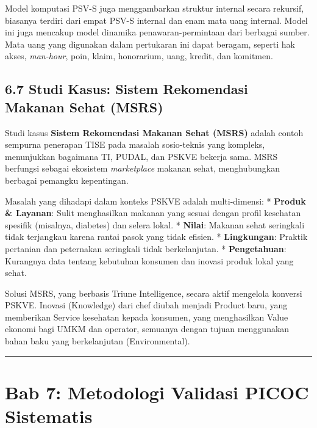 \documentclass[
  letterpaper,
  DIV=11,
  numbers=noendperiod]{scrreprt}
\begin{document}
Model komputasi PSV-S juga menggambarkan struktur internal secara
rekursif, biasanya terdiri dari empat PSV-S internal dan enam mata uang
internal. Model ini juga mencakup model dinamika penawaran-permintaan
dari berbagai sumber. Mata uang yang digunakan dalam pertukaran ini
dapat beragam, seperti hak akses, \emph{man-hour}, poin, klaim,
honorarium, uang, kredit, dan komitmen.

\section{\texorpdfstring{\textbf{6.7 Studi Kasus: Sistem Rekomendasi
Makanan Sehat
(MSRS)}}{6.7 Studi Kasus: Sistem Rekomendasi Makanan Sehat (MSRS)}}\label{studi-kasus-sistem-rekomendasi-makanan-sehat-msrs}

Studi kasus \textbf{Sistem Rekomendasi Makanan Sehat (MSRS)} adalah
contoh sempurna penerapan TISE pada masalah sosio-teknis yang kompleks,
menunjukkan bagaimana TI, PUDAL, dan PSKVE bekerja sama. MSRS berfungsi
sebagai ekosistem \emph{marketplace} makanan sehat, menghubungkan
berbagai pemangku kepentingan.

Masalah yang dihadapi dalam konteks PSKVE adalah multi-dimensi: *
\textbf{Produk \& Layanan}: Sulit menghasilkan makanan yang sesuai
dengan profil kesehatan spesifik (misalnya, diabetes) dan selera lokal.
* \textbf{Nilai}: Makanan sehat seringkali tidak terjangkau karena
rantai pasok yang tidak efisien. * \textbf{Lingkungan}: Praktik
pertanian dan peternakan seringkali tidak berkelanjutan. *
\textbf{Pengetahuan}: Kurangnya data tentang kebutuhan konsumen dan
inovasi produk lokal yang sehat.

Solusi MSRS, yang berbasis Triune Intelligence, secara aktif mengelola
konversi PSKVE. Inovasi (Knowledge) dari chef diubah menjadi Product
baru, yang memberikan Service kesehatan kepada konsumen, yang
menghasilkan Value ekonomi bagi UMKM dan operator, semuanya dengan
tujuan menggunakan bahan baku yang berkelanjutan (Environmental).

\begin{center}\rule{0.5\linewidth}{0.5pt}\end{center}


\chapter{\texorpdfstring{\textbf{Bab 7: Metodologi Validasi PICOC
Sistematis}}{Bab 7: Metodologi Validasi PICOC Sistematis}}\label{bab-7-metodologi-validasi-picoc-sistematis}
\end{document}
